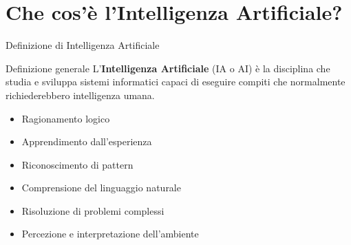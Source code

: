 \documentclass[aspectratio=169,12pt]{beamer}
\begin{document}
\section{Che cos'è l'Intelligenza Artificiale?}
%
%
\begin{frame}{Definizione di Intelligenza Artificiale}
    \begin{block}{Definizione generale}
        L'\textbf{Intelligenza Artificiale} (IA o AI) è la disciplina che studia e sviluppa sistemi informatici capaci di eseguire compiti che normalmente richiederebbero intelligenza umana.
    \end{block}
    
    \vspace{0.5cm}
    
    \begin{itemize}
        \item Ragionamento logico
        \item Apprendimento dall'esperienza
        \item Riconoscimento di pattern
        \item Comprensione del linguaggio naturale
        \item Risoluzione di problemi complessi
        \item Percezione e interpretazione dell'ambiente
    \end{itemize}
\end{frame}
%
%
\end{document}
